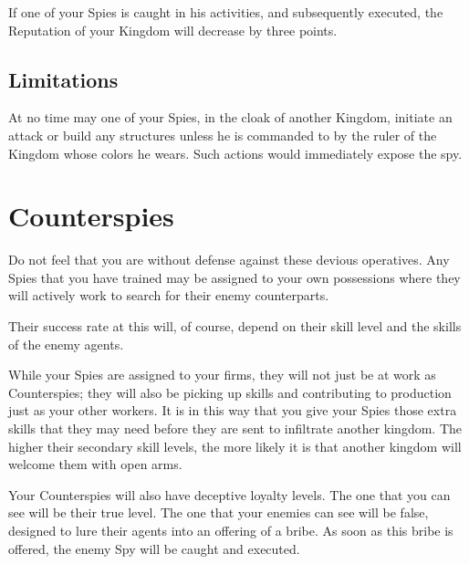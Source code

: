 If one of your Spies is caught in his activities, and subsequently executed, the Reputation of your Kingdom will decrease by three points.

\subsection{Limitations}

At no time may one of your Spies, in the cloak of another Kingdom, initiate an attack or build any structures unless he is commanded to by the ruler of the Kingdom whose colors he wears. Such actions would immediately expose the spy.

\section{Counterspies}


Do not feel that you are without defense against these devious operatives. Any Spies that you have trained may be assigned to your own possessions where they will actively work to search for their enemy counterparts.

Their success rate at this will, of course, depend on their skill level and the skills of the enemy agents.

While your Spies are assigned to your firms, they will not just be at work as Counterspies; they will also be picking up skills and contributing to production just as your other workers. It is in this way that you give your Spies those extra skills that they may need before they are sent to infiltrate another kingdom. The higher their secondary skill levels, the more likely it is that another kingdom will welcome them with open arms.

Your Counterspies will also have deceptive loyalty levels. The one that you can see will be their true level. The one that your enemies can see will be false, designed to lure their agents into an offering of a bribe. As soon as this bribe is offered, the enemy Spy will be caught and executed.